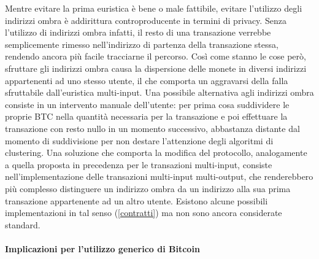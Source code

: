 Mentre evitare la prima euristica è bene o male fattibile, evitare l'utilizzo degli indirizzi ombra è addirittura controproducente in termini di privacy. Senza l'utilizzo di indirizzi ombra infatti, il resto di una transazione verrebbe semplicemente rimesso nell'indirizzo di partenza della transazione stessa, rendendo ancora più facile tracciarne il percorso.
Così come stanno le cose però, sfruttare gli indirizzi ombra causa la dispersione delle monete in diversi indirizzi appartenenti ad uno stesso utente, il che comporta un aggravarsi della falla sfruttabile dall'euristica multi-input.
Una possibile alternativa agli indirizzi ombra consiste in un intervento manuale dell'utente: per prima cosa suddividere le proprie BTC nella quantità necessaria per la transazione e poi effettuare la transazione con resto nullo in un momento successivo, abbastanza distante dal momento di suddivisione per non destare l'attenzione degli algoritmi di clustering.
Una soluzione che comporta la modifica del protocollo, analogamente a quella proposta in precedenza per le transazioni multi-input, consiste nell'implementazione delle transazioni multi-input multi-output, che renderebbero più complesso distinguere un indirizzo ombra da un indirizzo alla sua prima transazione appartenente ad un altro utente. Esistono alcune possibili implementazioni in tal senso (\ref{contratti}) ma non sono ancora considerate standard.

\paragraph{Implicazioni per l'utilizzo generico di Bitcoin}


